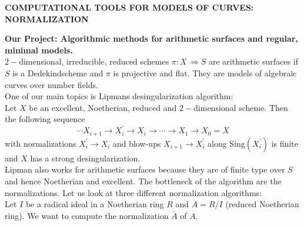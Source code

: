 \documentclass[12pt]{article}
\begin{document}
   \pagestyle{empty}
   \parindent0cm
    
   


   \begin{center}
     {\Large \bf COMPUTATIONAL TOOLS FOR MODELS OF CURVES: NORMALIZATION} 
     \end{center}
   \vspace{0.5cm}
   \normalsize
   \parindent0cm

    
   
\textbf{Our Project: Algorithmic methods for arithmetic surfaces and re\-gular, minimal models.}\\

$2-$dimensional, irreducible, reduced schemes $\pi:X\,\Longrightarrow S$ are arithmetic surfaces
if $S$ is a Dedekindscheme and $\pi$ is projective and flat.
They are models of algebraic curves over number fields.\\

One of our main topics is Lipmans desingularization algorithm:\\
Let $X$ be an excellent, Noetherian, reduced and $2-$dimensional scheme. Then the following sequence
$$ \cdots X_{i+1}\rightarrow X_i^\prime\rightarrow X_i\rightarrow\cdots\rightarrow X_1\rightarrow X_0=X$$
with normalizations  $X_i^\prime\rightarrow X_i$ and blow-ups $X_{i+1}\rightarrow X_i^\prime$ 
along Sing$(X_i^\prime)$ is finite and $X$ has a strong desingularization.\\

Lipman also works for arithmetic surfaces because they are of finite type over $S$ and hence 
Noetherian and excellent. The bottleneck of the algorithm are the normalizations.
Let us look at three different normalization algorithms:\\

Let $I$ be a radical ideal in a Noetherian ring $R$ and $A = R/I$ (reduced Noetherian ring). We 
want to compute the normalization $\overline{A}$ of $A$.\\
\end{document}
